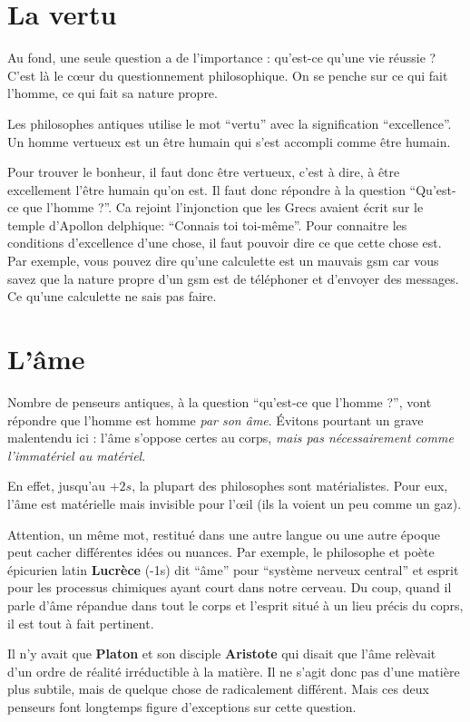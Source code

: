 \documentclass[11pt,a4paper]{article} %
\begin{document}
\section{La vertu}
Au fond, une seule question a de l'importance : qu'est-ce qu'une vie réussie ?
C'est là le cœur du questionnement philosophique.
On se penche sur ce qui fait l'homme, ce qui fait sa nature propre.

Les philosophes antiques utilise le mot ``vertu'' avec la signification ``excellence''.
Un homme vertueux est un être humain qui s'est accompli comme être humain.

Pour trouver le bonheur, il faut donc être vertueux, c'est à dire, à être excellement l'être humain qu'on est.
Il faut donc répondre à la question ``Qu'est-ce que l'homme ?''.
Ca rejoint l'injonction que les Grecs avaient écrit sur le temple d'Apollon delphique:
``Connais toi toi-même''.
Pour connaitre les conditions d'excellence d'une chose, il faut pouvoir dire ce que cette chose est.
Par exemple, vous pouvez dire qu'une calculette est un mauvais gsm car vous savez que la nature propre
d'un gsm est de téléphoner et d'envoyer des messages.
Ce qu'une calculette ne sais pas faire.

\section{L'âme}
Nombre de penseurs antiques, à la question ``qu'est-ce que l'homme ?'', vont répondre
que l'homme est homme \textit{par son âme}.
Évitons pourtant un grave malentendu ici : l'âme
s'oppose certes au corps, \textit{mais pas nécessairement comme l'immatériel au matériel}.

En effet, jusqu'au $+2s$, la plupart des philosophes sont matérialistes.
Pour eux, l'âme est matérielle mais invisible pour l'œil (ils la voient un peu comme un gaz).

Attention, un même mot, restitué dans une autre langue ou une autre époque peut cacher différentes idées ou nuances.
Par exemple, le philosophe et poète épicurien latin \textbf{Lucrèce} (-1s) dit ``âme'' pour ``système nerveux central'' et esprit pour les processus chimiques ayant court dans notre cerveau.
Du coup, quand il parle d'âme répandue dans tout le corps et l'esprit situé à un lieu précis du coprs, il est tout à fait pertinent.

Il n'y avait que \textbf{Platon} et son disciple \textbf{Aristote} qui disait que l'âme relèvait d'un ordre de réalité irréductible à la matière. Il ne s'agit donc pas d'une matière plus subtile, mais de quelque chose de
radicalement différent.
Mais ces deux penseurs font longtemps figure d'exceptions sur cette question.
\end{document}
